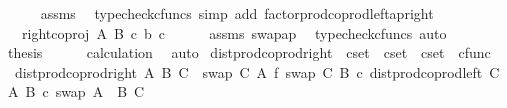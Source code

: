\begin{isabellebody}
\ \ \ \ \isamarkupfalse%
\ assms\ \isamarkupfalse%
\ {\isacharparenleft}{\kern0pt}typecheck{\isacharunderscore}{\kern0pt}cfuncs{\isacharcomma}{\kern0pt}\ simp\ add{\isacharcolon}{\kern0pt}\ factor{\isacharunderscore}{\kern0pt}prod{\isacharunderscore}{\kern0pt}coprod{\isacharunderscore}{\kern0pt}left{\isacharunderscore}{\kern0pt}ap{\isacharunderscore}{\kern0pt}right{\isacharparenright}{\kern0pt}\isanewline
\ \ \isamarkupfalse%
\ \isamarkupfalse%
\ {\isachardoublequoteopen}{\isachardot}{\kern0pt}{\isachardot}{\kern0pt}{\isachardot}{\kern0pt}\ {\isacharequal}{\kern0pt}\ {\isasymlangle}right{\isacharunderscore}{\kern0pt}coproj\ A\ B\ {\isasymcirc}\isactrlsub c\ b{\isacharcomma}{\kern0pt}\ c{\isasymrangle}{\isachardoublequoteclose}\isanewline
\ \ \ \ \isamarkupfalse%
\ assms\ swap{\isacharunderscore}{\kern0pt}ap\ \isamarkupfalse%
\ {\isacharparenleft}{\kern0pt}typecheck{\isacharunderscore}{\kern0pt}cfuncs{\isacharcomma}{\kern0pt}\ auto{\isacharparenright}{\kern0pt}\isanewline
\ \ \isamarkupfalse%
\ \isamarkupfalse%
\ {\isacharquery}{\kern0pt}thesis\isanewline
\ \ \ \ \isamarkupfalse%
\ calculation\ \isamarkupfalse%
\ auto\isanewline
{}\isamarkupfalse%
%
\endisatagproof
{\isafoldproof}%
%
\isadelimproof
%
\endisadelimproof
%
\isadelimdocument
%
\endisadelimdocument
%
\isatagdocument
%
\isamarkuptrue%
%
\endisatagdocument
{\isafolddocument}%
%
\isadelimdocument
%
\endisadelimdocument
{}\isamarkupfalse%
\ dist{\isacharunderscore}{\kern0pt}prod{\isacharunderscore}{\kern0pt}coprod{\isacharunderscore}{\kern0pt}right\ {\isacharcolon}{\kern0pt}{\isacharcolon}{\kern0pt}\ {\isachardoublequoteopen}cset\ {\isasymRightarrow}\ cset\ {\isasymRightarrow}\ cset\ {\isasymRightarrow}\ cfunc{\isachardoublequoteclose}\ \isanewline
\ \ {\isachardoublequoteopen}dist{\isacharunderscore}{\kern0pt}prod{\isacharunderscore}{\kern0pt}coprod{\isacharunderscore}{\kern0pt}right\ A\ B\ C\ {\isacharequal}{\kern0pt}\ {\isacharparenleft}{\kern0pt}swap\ C\ A\ {\isasymbowtie}\isactrlsub f\ swap\ C\ B{\isacharparenright}{\kern0pt}\ {\isasymcirc}\isactrlsub c\ dist{\isacharunderscore}{\kern0pt}prod{\isacharunderscore}{\kern0pt}coprod{\isacharunderscore}{\kern0pt}left\ C\ A\ B\ {\isasymcirc}\isactrlsub c\ swap\ {\isacharparenleft}{\kern0pt}A\ {\isasymCoprod}\ B{\isacharparenright}{\kern0pt}\ C{\isachardoublequoteclose}\isanewline

\end{isabellebody}
